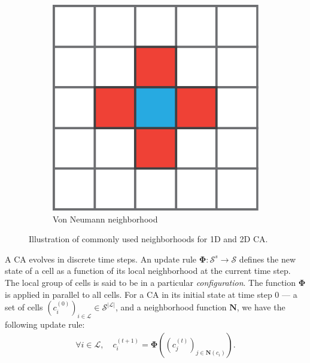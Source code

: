 \begin{figure}[htbp]
\begin{subfigure}[c]{.3\linewidth}
    \includegraphics[width=\linewidth]{figures/von_neumann}
    \caption{Von Neumann neighborhood}
    \label{fig:von_neumann}
  \end{subfigure}

  \caption{Illustration of commonly used neighborhoods for 1D and 2D \ac{CA}.}
  \label{fig:neighborhoods}
\end{figure}

A \ac{CA} evolves in discrete time steps. An update rule
$\boldsymbol{\Phi}: \mathcal{S}^{s} \rightarrow \mathcal{S}$ defines the new state of a cell as a function of its
local neighborhood at the current time step. The local group of cells is said to
be in a particular \emph{configuration}. The function $\boldsymbol{\Phi}$ is
applied in parallel to all cells. For a \ac{CA} in its initial state at time
step 0 --- \ie a set of cells $\left(c_{i}^{(0)}\right)_{i \in \mathcal{L}} \in \mathcal{S}^{|\mathcal{L}|}$, and a
neighborhood function $\boldsymbol{N}$, we have the following update rule:
\begin{equation}
\begin{aligned}
\forall i \in \mathcal{L}, \quad c_{i}^{(t + 1)} = \boldsymbol{\Phi}\left(
\left(c_{j}^{(t)}\right)_{j \in \boldsymbol{N}(c_i)}\right).
\end{aligned}
\end{equation}

